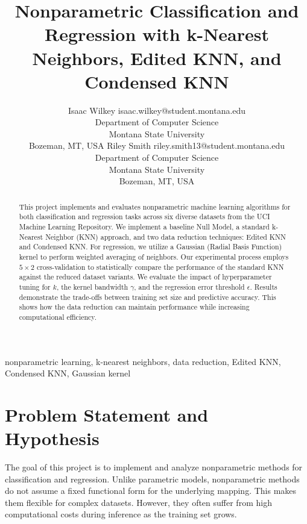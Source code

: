 \documentclass[twoside,11pt]{article}
\begin{document}
\title{Nonparametric Classification and Regression with k-Nearest Neighbors, Edited KNN, and Condensed KNN}

\author{\name Isaac Wilkey \email isaac.wilkey@student.montana.edu\\
\addr Department of Computer Science \\
Montana State University \\
Bozeman, MT, USA
\AND
\name Riley Smith \email riley.smith13@student.montana.edu\\
\addr Department of Computer Science \\
Montana State University \\
Bozeman, MT, USA
}

\maketitle

\begin{abstract}
This project implements and evaluates nonparametric machine learning algorithms for both classification and regression tasks across six diverse datasets from the UCI Machine Learning Repository. We implement a baseline Null Model, a standard k-Nearest Neighbor (KNN) approach, and two data reduction techniques: Edited KNN and Condensed KNN. For regression, we utilize a Gaussian (Radial Basis Function) kernel to perform weighted averaging of neighbors. Our experimental process employs $5 \times 2$ cross-validation to statistically compare the performance of the standard KNN against the reduced dataset variants. We evaluate the impact of hyperparameter tuning for $k$, the kernel bandwidth $\gamma$, and the regression error threshold $\epsilon$. Results demonstrate the trade-offs between training set size and predictive accuracy. This shows how the data reduction can maintain performance while increasing computational efficiency. 
\end{abstract}

\begin{keywords}
nonparametric learning, k-nearest neighbors, data reduction, Edited KNN, Condensed KNN, Gaussian kernel
\end{keywords}

\section{Problem Statement and Hypothesis}
The goal of this project is to implement and analyze nonparametric methods for classification and regression. Unlike parametric models, nonparametric methods do not assume a fixed functional form for the underlying mapping. This makes them flexible for complex datasets. However, they often suffer from high computational costs during inference as the training set grows. 
\end{document}
